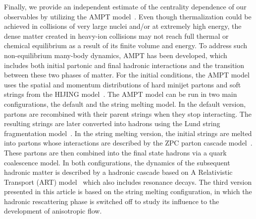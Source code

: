 \documentclass[ALICE,manyauthors]{cernphprep}
\begin{document}

Finally, we provide an independent estimate of the centrality dependence of our observables by utilizing the {AMPT} model~\cite{Zhang:1999bd,Lin:2000cx,Lin:2004en}.
Even though thermalization could be achieved in collisions of very large nuclei and/or at extremely high energy, the dense matter created in heavy-ion collisions may not reach full thermal or chemical equilibrium as a result of its finite volume and energy. To address such non-equilibrium many-body dynamics, AMPT has been developed, which includes both initial partonic and final hadronic interactions and the transition between these two phases of matter.
For the initial conditions, the AMPT model uses the spatial and momentum distributions of hard minijet partons and soft strings from the HIJING model~\cite{Wang:1991hta,Gyulassy:1994ew}.
The AMPT model can be run in two main configurations, the default and the string melting model.
In the default version, partons are recombined with their parent strings when they stop interacting. The resulting strings are later converted into hadrons using the Lund string fragmentation model~\cite{Andersson:1986gw,NilssonAlmqvist:1986rx}. In the string melting version, the initial strings are melted into partons whose interactions are described by the ZPC parton cascade model~\cite{Zhang:1997ej}. These partons are then combined into the final state hadrons via a quark coalescence model. 
In both configurations, the dynamics of the subsequent hadronic matter is described by a hadronic cascade based on A Relativistic Transport (ART) model~\cite{Li:2001xh} which also includes resonance decays.
The third version presented in this article is based on the string melting configuration, in which the hadronic rescattering phase is switched off to study its influence to the development of anisotropic flow.
\end{document}
